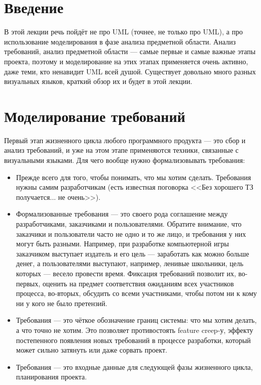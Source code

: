 \documentclass{../../text-style}
\begin{document}
\maketitle
\thispagestyle{empty}

\section{Введение}

В этой лекции речь пойдёт не про UML (точнее, не только про UML), а про использование моделирования в фазе анализа предметной области. Анализ требований, анализ предметной области --- самые первые и самые важные этапы проекта, поэтому и моделирование на этих этапах применяется очень активно, даже теми, кто ненавидит UML всей душой. Существует довольно много разных визуальных языков, краткий обзор их и будет в этой лекции.

\section{Моделирование требований}

Первый этап жизненного цикла любого программного продукта --- это сбор и анализ требований, и уже на этом этапе применяются техники, связанные с визуальными языками. Для чего вообще нужно формализовывать требования:

\begin{itemize}
    \item Прежде всего для того, чтобы понимать, что мы хотим сделать. Требования нужны самим разработчикам (есть известная поговорка <<Без хорошего ТЗ получается... не очень>>).
    \item Формализованные требования --- это своего рода соглашение между разработчиками, заказчиками и пользователями. Обратите внимание, что заказчики и пользователи часто не одно и то же лицо, и требования у них могут быть разными. Например, при разработке компьютерной игры заказчиком выступает издатель и его цель --- заработать как можно больше денег, а пользователями выступают, например, ленивые школьники, цель которых --- весело провести время. Фиксация требований позволит их, во-первых, оценить на предмет соответствия ожиданиям всех участников процесса, во-вторых, обсудить со всеми участниками, чтобы потом ни к кому ни у кого не было претензий.
    \item Требования --- это чёткое обозначение границ системы: что мы хотим делать, а что точно не хотим. Это позволяет противостоять feature creep-у, эффекту постепенного появления новых требований в процессе разработки, который может сильно затянуть или даже сорвать проект.
    \item Требования --- это входные данные для следующей фазы жизненного цикла, планирования проекта.
\end{itemize}
\end{document}
